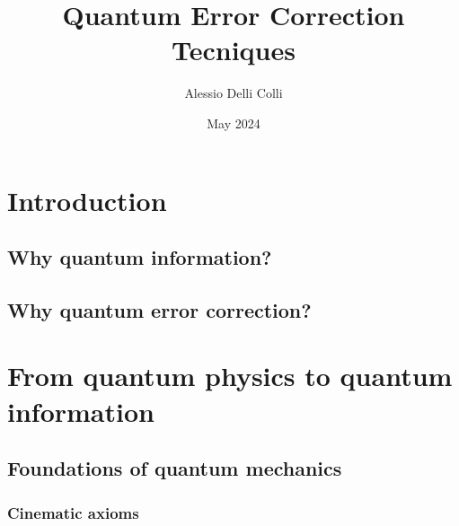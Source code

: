\documentclass{article}
\title{Quantum Error Correction Tecniques}
\author{Alessio Delli Colli}
\date{May 2024}
\begin{document}
\maketitle

\tableofcontents

\section{Introduction}

\subsection{Why quantum information?}



\subsection{Why quantum error correction?}

\newpage

\section{From quantum physics to quantum information}

\subsection{Foundations of quantum mechanics}

\subsubsection{Cinematic axioms}
\end{document}
